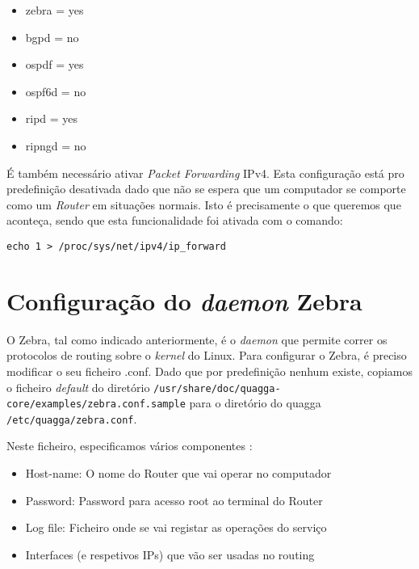 \begin{center}
    \begin{itemize}
        \centering
        \item zebra = yes
        \item bgpd = no
        \item ospdf = yes
        \item ospf6d = no
        \item ripd = yes
        \item ripngd = no
    \end{itemize}
\end{center}

É também necessário ativar \textit{Packet Forwarding} IPv4.
Esta configuração está pro predefinição desativada dado que não se espera que um computador se comporte como um \textit{Router} em situações normais.
Isto é precisamente o que queremos que aconteça, sendo que esta funcionalidade foi ativada com o comando:

\begin{center}
    \centering
    \verb|echo 1 > /proc/sys/net/ipv4/ip_forward|
\end{center}

\section{Configuração do \textit{daemon} Zebra}

O Zebra, tal como indicado anteriormente, é o \textit{daemon} que permite correr os protocolos de routing sobre o \textit{kernel} do Linux.
Para configurar o Zebra, é preciso modificar o seu ficheiro .conf. Dado que por predefinição nenhum existe, copiamos o ficheiro \textit{default}
do diretório \verb|/usr/share/doc/quagga-core/examples/zebra.conf.sample| para o diretório do quagga \verb|/etc/quagga/zebra.conf|.

Neste ficheiro, especificamos vários componentes \cite{zebra}:
\begin{itemize}
    \item Host-name: O nome do Router que vai operar no computador
    \item Password: Password para acesso root ao terminal do Router
    \item Log file: Ficheiro onde se vai registar as operações do serviço
    \item Interfaces (e respetivos IPs) que vão ser usadas no routing
\end{itemize}

